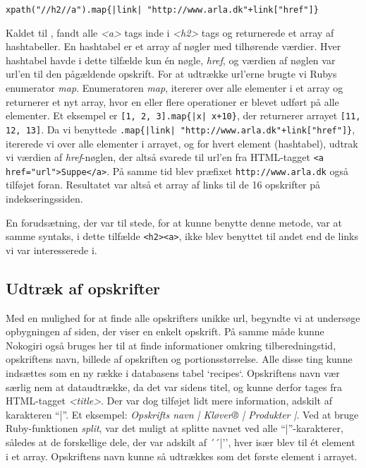 \texttt{xpath("//h2//a").map\{|link| "http://www.arla.dk"+link["href"]\}}

Kaldet til , fandt alle \textit{<a>} tags inde i \textit{<h2>} tags og returnerede et array af hashtabeller. En hashtabel er et array af nøgler med tilhørende værdier. Hver hashtabel havde i dette tilfælde kun én nøgle, \textit{href}, og værdien af nøglen var url'en til den pågældende opskrift. For at udtrække url'erne brugte vi Rubys enumerator \textit{map}. Enumeratoren \textit{map}, itererer over alle elementer i et array og returnerer et nyt array, hvor en eller flere operationer er blevet udført på alle elementer\cite{rubydoc}. Et eksempel er \texttt{[1, 2, 3].map\{|x| x+10\}}, der returnerer arrayet \texttt{[11, 12, 13]}. Da vi benyttede \texttt{.map\{|link| "http://www.arla.dk"+link["href"]\}}, itererede vi over alle elementer i arrayet, og for hvert element (hashtabel), udtrak vi værdien af \textit{href}-nøglen, der altså svarede til url'en fra HTML-tagget \texttt{<a href="url">Suppe</a>}. På samme tid blev præfixet \texttt{http://www.arla.dk} også tilføjet foran. Resultatet var altså et array af links til de 16 opskrifter på indekseringssiden.

En forudsætning, der var til stede, for at kunne benytte denne metode, var at samme syntaks, i dette tilfælde \lstinline{<h2><a>}, ikke blev benyttet til andet end de links vi var interesserede i.


\subsection{Udtræk af opskrifter}

Med en mulighed for at finde alle opskrifters unikke url, begyndte vi at undersøge opbygningen af siden, der viser en enkelt opskrift.
På samme måde kunne Nokogiri også bruges her til at finde informationer omkring tilberedningstid, opskriftens navn, billede af opskriften og portionsstørrelse. Alle disse ting kunne indsættes som en ny række i databasens tabel `recipes`. Opskriftens navn vær særlig nem at dataudtrække, da det var sidens titel, og kunne derfor tages fra HTML-tagget \textit{<title>}. Der var dog tilføjet lidt mere information, adskilt af karakteren ``|''. Et eksempel: \textit{Opskrifts navn | Kløver® | Produkter |}. Ved at bruge Ruby-funktionen \textit{split}\cite{rubydoc}, var det muligt at splitte navnet ved alle ``|''-karakterer, således at de forskellige dele, der var adskilt af ´´|'', hver især blev til ét element i et array. Opskriftens navn kunne så udtrækkes som det første element i arrayet.


